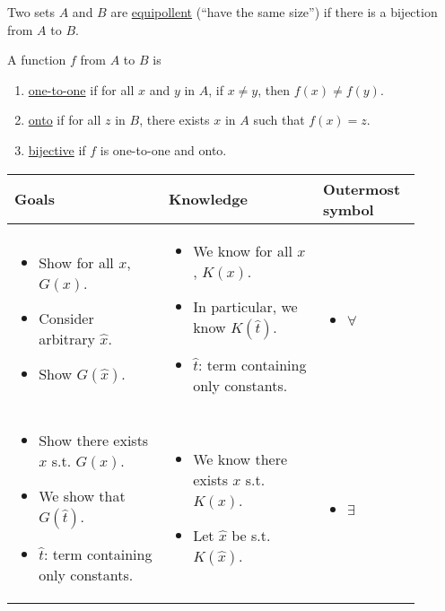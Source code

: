\begin{definition}
  Two sets $A$ and $B$ are \underline{equipollent} (``have the same 
  size'') if there is a bijection from $A$ to $B$.
\end{definition}

\begin{definition}
  A function $f$ from $A$ to $B$ is 
  \begin{enumerate}
    \item \underline{one-to-one} if for all $x$ and $y$ in $A$, if 
    $x \neq y$, then $f(x) \neq f(y)$.
    \item \underline{onto} if for all $z$ in $B$, there exists $x$ 
    in $A$ such that $f(x) = z$.
    \item \underline{bijective} if $f$ is one-to-one and onto.
  \end{enumerate}
\end{definition}

\begin{center}
\begin{tabular}{
  p{0.35\linewidth} | p{0.35\linewidth} | p{0.2\linewidth}}
  Goals & Knowledge & Outermost symbol \\
  \hline
  \begin{itemize}[leftmargin=*]
    \item[] Show for all $x$, $G(x)$.
    \item[] Consider arbitrary $\hat{x}$.
    \item[] Show $G(\hat{x})$. 
  \end{itemize} & \begin{itemize}[leftmargin=*]
    \item[] We know for all $x$, $K(x)$.
    \item[] In particular, we know $K(\hat{t})$.
    \item[] $\hat{t}$: term containing only constants. 
  \end{itemize} & \begin{itemize}
    \item[] \Large $\forall$
  \end{itemize} \\ 
  \hline 
  \begin{itemize}[leftmargin=*]
    \item[] Show there exists $x$ s.t. $G(x)$.
    \item[] We show that $G(\hat{t})$.
    \item[] $\hat{t}$: term containing only constants.
  \end{itemize} & \begin{itemize}[leftmargin=*]
    \item[] We know there exists $x$ s.t. $K(x)$.
    \item[] Let $\hat{x}$ be s.t. $K(\hat{x})$.
  \end{itemize} & \begin{itemize}
    \item[] \Large $\exists$
  \end{itemize}
\end{tabular}
\end{center}